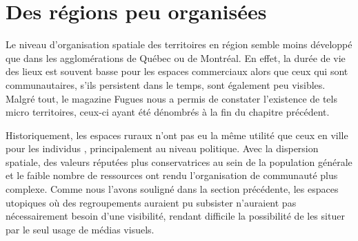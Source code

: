 \section{Des régions peu organisées}
\label{sec:des_regions_peu_organisees}
Le niveau d'organisation spatiale des territoires en région semble moins développé que dans les agglomérations de Québec ou de Montréal.
En effet, la durée de vie des lieux est souvent basse pour les espaces commerciaux alors que ceux qui sont communautaires, s'ils persistent dans le temps, sont également peu visibles.
Malgré tout, le magazine Fugues nous a permis de constater l'existence de tels micro territoires, ceux-ci ayant été dénombrés à la fin du chapitre précédent.

Historiquement, les espaces ruraux n'ont pas eu la même utilité que ceux en ville pour les individus \lgbt{}, principalement au niveau politique.
Avec la dispersion spatiale, des valeurs réputées plus conservatrices au sein de la population générale et le faible nombre de ressources ont rendu l'organisation de communauté \lgbt{} plus complexe.
Comme nous l'avons souligné dans la section précédente, les espaces utopiques où des regroupements \lgbt{} auraient pu subsister n'auraient pas nécessairement besoin d'une visibilité, rendant difficile la possibilité de les situer par le seul usage de médias visuels.



